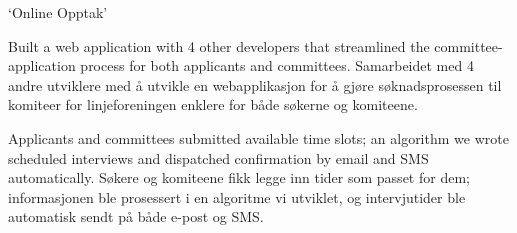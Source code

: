 \cvselected
{`Online Opptak'}
{}
{}


\begin{cvbullets}
  \item \enor
  {Built a web application with 4 other developers that streamlined
    the committee-application process for both applicants and
    committees.}
  {Samarbeidet med 4 andre utviklere med å utvikle en webapplikasjon
    for å gjøre søknadsprosessen til komiteer for linjeforeningen
    enklere for både søkerne og komiteene.}
  \item \enor
  {Applicants and committees submitted available time slots; an
    algorithm we wrote scheduled interviews and dispatched
    confirmation by email and SMS automatically.}
  {Søkere og komiteene fikk legge inn tider som passet for dem;
    informasjonen ble prosessert i en algoritme vi utviklet, og
    intervjutider ble automatisk sendt på både e-post og SMS.}
\end{cvbullets}
